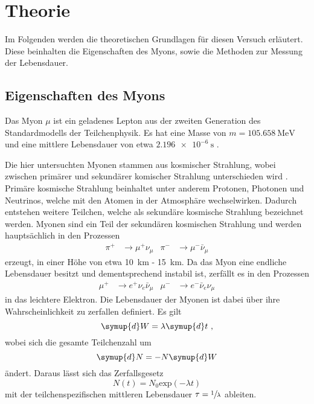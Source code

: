 \section{Theorie}
\label{sec:theorie}

Im Folgenden werden die theoretischen Grundlagen für diesen Versuch erläutert.
Diese beinhalten die Eigenschaften des Myons, 
sowie die Methoden zur Messung der Lebensdauer.

\subsection{Eigenschaften des Myons}

Das Myon $\mu$ ist ein geladenes Lepton aus der zweiten Generation des Standardmodells der Teilchenphysik.
Es hat eine Masse von $m = \SI{105.658}{\mega\eV}$ und eine mittlere Lebensdauer von etwa $\SI{2,196e-6}{\second}$ \cite{pdg}.

Die hier untersuchten Myonen stammen aus kosmischer Strahlung,
wobei zwischen primärer und sekundärer komischer Strahlung unterschieden wird \cite{grupen}.
Primäre kosmische Strahlung beinhaltet unter anderem Protonen, 
Photonen und Neutrinos,
welche mit den Atomen in der Atmosphäre wechselwirken.
Dadurch entstehen weitere Teilchen, 
welche als sekundäre kosmische Strahlung bezeichnet werden.
Myonen sind ein Teil der sekundären kosmischen Strahlung und werden hauptsächlich in den Prozessen
\begin{align*}
    \pi^{+} &\to \mu^{+} \nu_{\mu} & \pi^{-} &\to \mu^{-} \bar{\nu}_{\mu}
\end{align*}
erzeugt,
in einer Höhe von etwa \SI{10}{\kilo\meter} - \SI{15}{\kilo\meter}.
Da das Myon eine endliche Lebensdauer besitzt und dementsprechend instabil ist, 
zerfällt es in den Prozessen 
\begin{align*}
    \mu^{+} &\to e^{+} \nu_{e} \bar{\nu}_{\mu} & \mu^{-} &\to e^{-} \bar{\nu}_{e} \nu_{\mu}
\end{align*}
in das leichtere Elektron.
Die Lebensdauer der Myonen ist dabei über ihre Wahrscheinlichkeit zu zerfallen definiert.
Es gilt
\begin{equation*}
    \symup{d}W = \lambda \symup{d}t \ ,
\end{equation*}
wobei sich die gesamte Teilchenzahl um 
\begin{equation*}
    \symup{d}N = -N \symup{d}W
\end{equation*}
ändert.
Daraus lässt sich das Zerfallsgesetz
\begin{equation}
    N(t) = N_0 \text{exp}(- \lambda t)
\end{equation}
mit der teilchenspezifischen mittleren Lebensdauer $\tau = \sfrac{1}{\lambda}$ ableiten.

